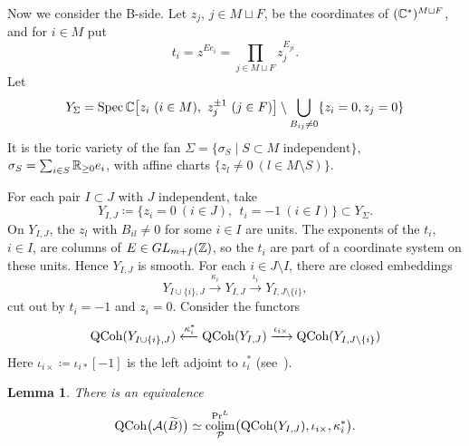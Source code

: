 \documentclass[12pt, letter]{amsart}
\newtheorem{lemma}[dummy]{Lemma}
\theoremstyle{definition}
\begin{document}
Now we consider the B-side.
Let $z_j$, $j\in M\sqcup F$, be the coordinates of $(\mathbb{C}^*)^{M\sqcup F}$, and for $i\in M$ put
\[
  t_i=z^{Ee_i}=\prod_{j\in M\sqcup F}z_j^{E_{ji}} .
\]
Let
\[
 Y_\Sigma=\Spec\bC\bigl[z_i\ (i\in M),\ z_j^{\pm1}\ (j\in F)\bigr]\setminus\bigcup_{B_{ij}\ne0} \{ z_i = 0, z_j = 0\}
\]
It is the toric variety of the fan $\Sigma=\{\sigma_S\mid S\subset M\text{ independent}\}$, $\sigma_S=\sum_{i\in S}\mathbb{R}_{\ge0}e_i$, with affine charts $\{z_l\ne0\ (l\in M\setminus S)\}$.


For each pair $I\subset J$ with \(J\) independent, take
\[
 Y_{I,J} \coloneqq  \{z_i=0\ (i\in J),\ \ t_i=-1\ (i\in I)\}\subset Y_\Sigma .
\]
On $Y_{I,J}$, the $z_l$ with $B_{il}\ne0$ for some $i\in I$ are units.
The exponents of the $t_i$, $i\in I$, are columns of $E\in GL_{m+f}(\mathbb{Z})$, so the $t_i$ are part of a coordinate system on these units.
Hence $Y_{I,J}$ is smooth.
For each $i\in J\setminus I$, there are closed embeddings
\[
 Y_{I\cup\{i\},J}\xrightarrow{\ \kappa_i\ }Y_{I,J}\xrightarrow{\ \iota_i\ }Y_{I,J\setminus\{i\}},
\]
cut out by $t_i=-1$ and $z_i=0$. 
Consider the functors
\[
\operatorname{QCoh}( Y_{I \cup \{i\}, J} ) \xleftarrow{\kappa_i^*} \operatorname{QCoh}(Y_{I, J}) \xrightarrow{\iota_{i\times}} \operatorname{QCoh}( Y_{I, J\setminus\{i\} })
\]
Here \( \iota_{i \times} \coloneqq  \iota_{i*}[-1] \) 
is the left adjoint to \(\iota_i^*\)  (see~\cite[Proposition 4.5]{FSZ}). 


\begin{lemma}\label{lem:acyclic-blowup}
There is an equivalence
\begin{equation}\label{eq:acyclic-microlocal-colimit}
 \operatorname{QCoh}\bigl(\mathcal{A}(\widetilde B )\bigr)
 \simeq\operatorname*{colim}_{\mathcal{P}}^{\operatorname{Pr}^L}
 \bigl(\operatorname{QCoh}(Y_{I,J}), \iota_{i\times}, \kappa_i^*\bigr).
\end{equation}
\end{lemma}
\end{document}
